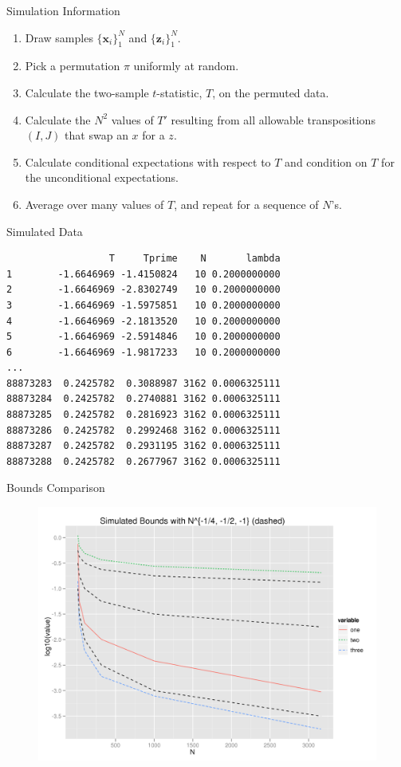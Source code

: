 \documentclass{beamer}
\begin{document}
\begin{frame}{Simulation Information}
  \begin{enumerate}
  \item Draw samples $\{\mathbf{x}_i\}_1^{N}$ and
    $\{\mathbf{z}_i\}_1^{N}$. \pause
  \item Pick a permutation $\pi$ uniformly at random. \pause
  \item Calculate the two-sample $t$-statistic, $T$, on the permuted
    data. \pause
  \item Calculate the $N^2$ values of $T'$ resulting from all
    allowable transpositions $(I, J)$ that swap an $x$ for a $z$.
  \item Calculate conditional expectations with respect to $T$ and
    condition on $T$ for the unconditional expectations. \pause
  \item Average over many values of $T$, and repeat for a sequence of
    $N$'s.  
  \end{enumerate}
\end{frame}

\begin{frame}[fragile]{Simulated Data}
\begin{verbatim}
                  T     Tprime    N       lambda
1        -1.6646969 -1.4150824   10 0.2000000000
2        -1.6646969 -2.8302749   10 0.2000000000
3        -1.6646969 -1.5975851   10 0.2000000000
4        -1.6646969 -2.1813520   10 0.2000000000
5        -1.6646969 -2.5914846   10 0.2000000000
6        -1.6646969 -1.9817233   10 0.2000000000
...
88873283  0.2425782  0.3088987 3162 0.0006325111
88873284  0.2425782  0.2740881 3162 0.0006325111
88873285  0.2425782  0.2816923 3162 0.0006325111
88873286  0.2425782  0.2992468 3162 0.0006325111
88873287  0.2425782  0.2931195 3162 0.0006325111
88873288  0.2425782  0.2677967 3162 0.0006325111
\end{verbatim}
\end{frame}

\begin{frame}{Bounds Comparison}
  \begin{figure}[!ht]
   \centering
   \includegraphics[scale=.5]{boundsexact.png}
 \end{figure}
\end{frame}
\end{document}
